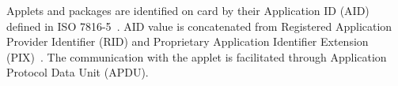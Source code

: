 \documentclass{../llncs/llncs}
\begin{document}

Applets and packages are identified on card by their Application ID (AID) defined in ISO 7816-5~\cite{jcspecs31download}. AID value is concatenated from Registered Application Provider Identifier (RID) and Proprietary Application Identifier Extension (PIX)~\cite{globalplatform}. The communication with the applet is facilitated through Application Protocol Data Unit (APDU). 


\end{document}
